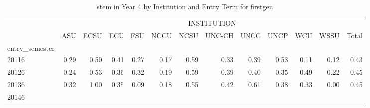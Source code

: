 \begin{table}[!h]
\caption{stem in Year 4 by Institution and Entry Term for firstgen}
\centering
\begin{tabular}{lllllllllllll}
\cline{1-13}
\multicolumn{1}{c}{} &
  \multicolumn{12}{|c}{INSTITUTION} \\
\multicolumn{1}{c}{} &
  \multicolumn{1}{|r}{ASU} &
  \multicolumn{1}{r}{ECSU} &
  \multicolumn{1}{r}{ECU} &
  \multicolumn{1}{r}{FSU} &
  \multicolumn{1}{r}{NCCU} &
  \multicolumn{1}{r}{NCSU} &
  \multicolumn{1}{r}{UNC-CH} &
  \multicolumn{1}{r}{UNCC} &
  \multicolumn{1}{r}{UNCP} &
  \multicolumn{1}{r}{WCU} &
  \multicolumn{1}{r}{WSSU} &
  \multicolumn{1}{r}{Total} \\
\cline{1-13}
\multicolumn{1}{l}{entry\_semester} &
  \multicolumn{1}{|r}{} &
  \multicolumn{1}{r}{} &
  \multicolumn{1}{r}{} &
  \multicolumn{1}{r}{} &
  \multicolumn{1}{r}{} &
  \multicolumn{1}{r}{} &
  \multicolumn{1}{r}{} &
  \multicolumn{1}{r}{} &
  \multicolumn{1}{r}{} &
  \multicolumn{1}{r}{} &
  \multicolumn{1}{r}{} &
  \multicolumn{1}{r}{} \\
\multicolumn{1}{l}{\hspace{1em}20116} &
  \multicolumn{1}{|r}{0.29} &
  \multicolumn{1}{r}{0.50} &
  \multicolumn{1}{r}{0.41} &
  \multicolumn{1}{r}{0.27} &
  \multicolumn{1}{r}{0.17} &
  \multicolumn{1}{r}{0.59} &
  \multicolumn{1}{r}{0.33} &
  \multicolumn{1}{r}{0.39} &
  \multicolumn{1}{r}{0.53} &
  \multicolumn{1}{r}{0.11} &
  \multicolumn{1}{r}{0.12} &
  \multicolumn{1}{r}{0.43} \\
\multicolumn{1}{l}{\hspace{1em}20126} &
  \multicolumn{1}{|r}{0.24} &
  \multicolumn{1}{r}{0.53} &
  \multicolumn{1}{r}{0.36} &
  \multicolumn{1}{r}{0.32} &
  \multicolumn{1}{r}{0.19} &
  \multicolumn{1}{r}{0.59} &
  \multicolumn{1}{r}{0.39} &
  \multicolumn{1}{r}{0.40} &
  \multicolumn{1}{r}{0.35} &
  \multicolumn{1}{r}{0.49} &
  \multicolumn{1}{r}{0.22} &
  \multicolumn{1}{r}{0.45} \\
\multicolumn{1}{l}{\hspace{1em}20136} &
  \multicolumn{1}{|r}{0.32} &
  \multicolumn{1}{r}{1.00} &
  \multicolumn{1}{r}{0.35} &
  \multicolumn{1}{r}{0.09} &
  \multicolumn{1}{r}{0.18} &
  \multicolumn{1}{r}{0.55} &
  \multicolumn{1}{r}{0.42} &
  \multicolumn{1}{r}{0.61} &
  \multicolumn{1}{r}{0.38} &
  \multicolumn{1}{r}{0.33} &
  \multicolumn{1}{r}{0.00} &
  \multicolumn{1}{r}{0.45} \\
\multicolumn{1}{l}{\hspace{1em}20146} &

\end{tabular}
\end{table}
